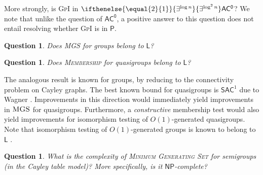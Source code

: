 \documentclass{article}
\newcommand{\algprobm}[1]{\textsc{#1}\xspace}
\newcommand{\betacc}[1]{\ifthenelse{\equal{#1}{1}}{\exists^{\log n}}{\exists^{\log^{#1}n}}} %
\newtheorem{question}[theorem]{Question}
\newcommand*{\ComplexityClass}[1]{\ensuremath{\mathsf{#1}}\xspace}
\newcommand*{\NP}{\ComplexityClass{NP}}
\renewcommand{\P}{\ComplexityClass{P}}
\newcommand*{\LogSpace}{\ComplexityClass{L}}
\newcommand{\SAC}{\ComplexityClass{SAC}}
\newcommand{\ACz}{\ComplexityClass{AC^0}}
\begin{document}
More strongly, is \algprobm{GpI} in $\betacc{2}\ACz$? We note that unlike the question of $\ACz$, a positive answer to this question does not entail resolving whether \algprobm{GpI} is in $\P$.

\begin{question}
Does \algprobm{MGS} for groups belong to $\LogSpace$?
\end{question}


\begin{question}
Does \algprobm{Membership} for quasigroups belong to $\LogSpace$?
\end{question}

The analogous result is known for groups, by reducing to the connectivity problem on Cayley graphs. The best known bound for quasigroups is $\SAC^{1}$ due to Wagner \cite{WagnerThesis}. Improvements in this direction would immediately yield improvements in $\algprobm{MGS}$ for quasigroups. Furthermore, a \textit{constructive} membership test would also yield improvements for isomorphism testing of $O(1)$-generated quasigroups. Note that isomorphism testing of $O(1)$-generated groups is known to belong to $\LogSpace$ \cite{TangThesis}.

\begin{question}
What is the complexity of \algprobm{Minimum Generating Set} for semigroups (in the Cayley table model)? More specifically, is it \NP-complete?
\end{question}







\end{document}
